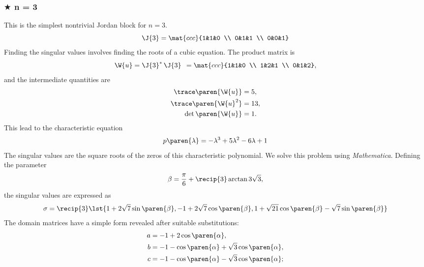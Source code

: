 \subsubsection{$\bigstar$ n = 3}
This is the simplest nontrivial Jordan block for $n=3$.
\begin{equation}
  \J{3} = \mat{ccc}{1&1&0 \\ 0&1&1 \\ 0&0&1}
\end{equation}
Finding the singular values involves finding the roots of a cubic equation. The product matrix is
%
\begin{equation}
  \W{u} = \J{3}^{*}\,\J{3}^{\phantom{*}} = \mat{ccc}{1&1&0 \\ 1&2&1 \\ 0&1&2},
\end{equation}
%
and the intermediate quantities are
%
\begin{equation}
  \begin{split}
    \trace \paren{\W{u}}     &= 5, \\
    \trace \paren{\W{u}^{2}} &= 13, \\
    \det \paren{\W{u}}       &= 1.
  \end{split}
\end{equation}
%
This lead to the characteristic equation
%
\begin{equation}
  p\paren{\lambda} = -\lambda^{3} + 5 \lambda^{2} - 6 \lambda + 1
\end{equation}
%
The singular values are the square roots of the zeros of this characteristic polynomial. We solve this problem using \emph{Mathematica}. Defining the parameter
%
\begin{equation}
  \beta = \frac{\pi} {6} + \recip{3} \arctan{3 \sqrt{3}},
\end{equation}
%
the singular values are expressed as
%
\begin{equation}
  \sigma = \recip{3}
  \lst{ 1 + 2 \sqrt{7} \sin \paren{\beta} ,
       -1 + 2 \sqrt{7} \cos \paren{\beta} ,
        1 +  \sqrt{21} \cos \paren{\beta} - \sqrt{7} \sin \paren{\beta} }
\end{equation}
%
The domain matrices have a simple form revealed after suitable substitutions:
%
\begin{equation}
  \begin{split}
    a &= -1 + 2 \cos \paren{\alpha} ,  \\
    b &= -1 -   \cos \paren{\alpha} + \sqrt{3} \cos \paren{\alpha} , \\
    c &= -1 -   \cos \paren{\alpha} - \sqrt{3} \cos \paren{\alpha} ;
  \end{split}
\end{equation}
